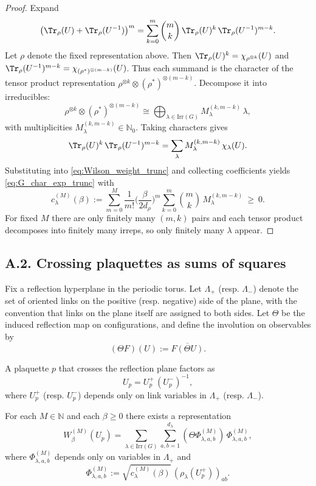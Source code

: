 \begin{proof}
Expand
\[
\big(\Tr_{\rho}(U)+\Tr_{\rho}(U^{-1})\big)^{m}
=\sum_{k=0}^{m}\binom{m}{k}\,\Tr_{\rho}(U)^k\,\Tr_{\rho}(U^{-1})^{m-k}.
\]
Let $\rho$ denote the fixed representation above.
Then $\Tr_{\rho}(U)^k=\chi_{\rho^{\otimes k}}(U)$ and $\Tr_{\rho}(U^{-1})^{m-k}=\chi_{(\rho^*)^{\otimes (m-k)}}(U)$.
Thus each summand is the character of the tensor product representation
$\rho^{\otimes k}\otimes (\rho^*)^{\otimes (m-k)}$.
Decompose it into irreducibles:
\[
\rho^{\otimes k}\otimes (\rho^*)^{\otimes (m-k)}\cong\bigoplus_{\lambda\in\mathrm{Irr}(G)} M^{(k,m-k)}_{\lambda}\,\lambda,
\]
with multiplicities $M^{(k,m-k)}_{\lambda}\in\mathbb N_0$.
Taking characters gives
\[
\Tr_{\rho}(U)^k\,\Tr_{\rho}(U^{-1})^{m-k}
=\sum_{\lambda} M^{(k,m-k)}_{\lambda}\,\chi_{\lambda}(U).
\]
Substituting into \eqref{eq:Wilson_weight_trunc} and collecting coefficients yields \eqref{eq:G_char_exp_trunc} with
\[
 c^{(M)}_{\lambda}(\beta)
 :=\sum_{m=0}^{M}\frac{1}{m!}\Big(\frac{\beta}{2d_\rho}\Big)^{m}\sum_{k=0}^{m}\binom{m}{k}\,M^{(k,m-k)}_{\lambda}\ \ge\ 0.
\]
For fixed $M$ there are only finitely many $(m,k)$ pairs and each tensor product decomposes into finitely many irreps,
so only finitely many $\lambda$ appear.
\end{proof}

\subsection*{A.2. Crossing plaquettes as sums of squares}

Fix a reflection hyperplane in the periodic torus.
Let $\Lambda_+$ (resp. $\Lambda_-$) denote the set of oriented links on the positive (resp. negative) side of the plane,
with the convention that links on the plane itself are assigned to both sides.
Let $\Theta$ be the induced reflection map on configurations, and define the involution on observables by
\begin{equation}\label{eq:Theta_def_appA}
(\Theta F)(U):=\overline{F(\Theta U)}.
\end{equation}

A plaquette $p$ that crosses the reflection plane factors as
\begin{equation}\label{eq:Up_factor_crossing}
U_p=U_p^+\,(U_p^-)^{-1},
\end{equation}
where $U_p^+$ (resp. $U_p^-$) depends only on link variables in $\Lambda_+$ (resp. $\Lambda_-$).

\begin{lemma}\label{lem:crossing_square}
For each $M\in\mathbb N$ and each $\beta\ge 0$ there exists a representation
\[
W_{\beta}^{(M)}(U_p)=\sum_{\lambda\in\mathrm{Irr}(G)}\sum_{a,b=1}^{d_\lambda} (\Theta\Phi^{(M)}_{\lambda,a,b})\,\Phi^{(M)}_{\lambda,a,b},
\]
where $\Phi^{(M)}_{\lambda,a,b}$ depends only on variables in $\Lambda_+$ and
\[
\Phi^{(M)}_{\lambda,a,b}:=\sqrt{c^{(M)}_{\lambda}(\beta)}\,(\rho_\lambda(U_p^+))_{ab}.
\]
\end{lemma}

